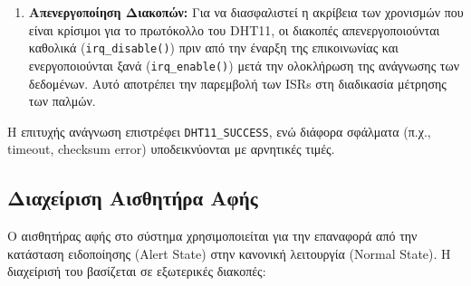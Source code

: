 \documentclass{article}
\begin{document}
\begin{enumerate}
    \item \textbf{Απενεργοποίηση Διακοπών:}
    Για να διασφαλιστεί η ακρίβεια των χρονισμών που είναι κρίσιμοι για το πρωτόκολλο του DHT11, οι διακοπές απενεργοποιούνται καθολικά (\texttt{irq\_disable()}) πριν από την έναρξη της επικοινωνίας και ενεργοποιούνται ξανά (\texttt{irq\_enable()}) μετά την ολοκλήρωση της ανάγνωσης των δεδομένων. Αυτό αποτρέπει την παρεμβολή των ISRs στη διαδικασία μέτρησης των παλμών.
\end{enumerate}
Η επιτυχής ανάγνωση επιστρέφει \texttt{DHT11\_SUCCESS}, ενώ διάφορα σφάλματα (π.χ., timeout, checksum error) υποδεικνύονται με αρνητικές τιμές.
\bigskip %

\subsection{Διαχείριση Αισθητήρα Αφής}
\label{subsec:touch_sensor}
Ο αισθητήρας αφής στο σύστημα χρησιμοποιείται για την επαναφορά από την κατάσταση ειδοποίησης (Alert State) στην κανονική λειτουργία (Normal State). Η διαχείρισή του βασίζεται σε εξωτερικές διακοπές:
\end{document}

